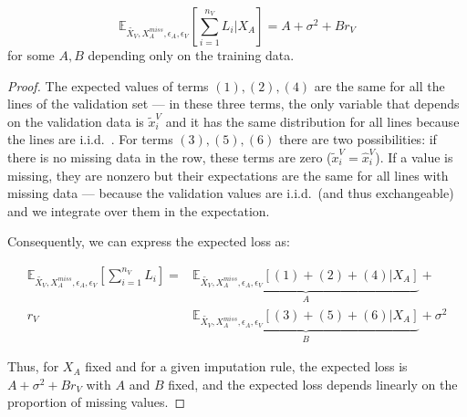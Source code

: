 \begin{proposition}
\label{prop.linear}
$$ \mathbb{E}_{\tilde{X_V}, X_A^{miss}, \epsilon_A, \epsilon_V}[\sum\limits_{i=1}^{n_V} L_i \vert X_A] = A + \sigma^2 + Br_V$$
for some $A,B$ depending only on the training data.
\end{proposition}
\begin{proof}
The expected values of terms $(1),(2),(4)$ are the same for all the lines of the validation set --- in these three terms, the only variable that depends on the validation data is $\tilde{x}_i^V$ and it has the same distribution for all lines because the lines are i.i.d.\ . For terms $(3), (5), (6)$ there are two possibilities: if there is no missing data in the row, these terms are zero ($\tilde{x}_i^V = \hat{x}_i^V$). If a value is missing, they are nonzero but their expectations are the same for all lines with missing data --- because the validation values are i.i.d.\ (and thus exchangeable) and we integrate over them in the expectation. 

Consequently, we can express the expected loss as:

\begin{align}
\label{eq.loss}
\mathbb{E}_{\tilde{X_V}, X_A^{miss}, \epsilon_A, \epsilon_V}[\sum\limits_{i=1}^{n_V} L_i] = &\underbrace{\mathbb{E}_{\tilde{X_V}, X_A^{miss}, \epsilon_A, \epsilon_V}[(1) + (2) + (4)\vert X_A]}_{A} + \\ 
r_V& \underbrace{\mathbb{E}_{\tilde{X_V}, X_A^{miss}, \epsilon_A, \epsilon_V}[(3) + (5) + (6)\vert X_A]}_{B} + \sigma^2
\end{align}

Thus, for $X_A$ fixed and for a given imputation rule, the expected loss is $A + \sigma^2 + Br_V$ with $A$ and $B$ fixed, and the expected loss depends linearly on the proportion of missing values. 
\end{proof}


